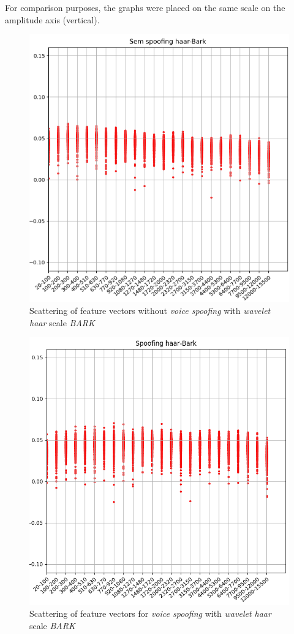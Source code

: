 \par For comparison purposes, the graphs were placed on the same scale on the amplitude axis (vertical).

\begin{figure}[!h]
	\centering
	\includegraphics[width=.70\linewidth, height=.68\linewidth]{images/results/barkVersusMel/liveHaarBark}
	\caption{Scattering of feature vectors without \textit{voice spoofing} with \textit{wavelet haar} scale \textit {BARK}}
	\label{fig:livehaarbark}
\end{figure}

\begin{figure}[!h]
	\centering
	\includegraphics[width=.70\linewidth, height=.68\linewidth]{images/results/barkVersusMel/spoofingHaarBark}
	\caption{Scattering of feature vectors for \textit{voice spoofing} with \textit{wavelet haar} scale \textit{BARK}}
	\label{fig:spoofinghaarbark}
\end{figure}

